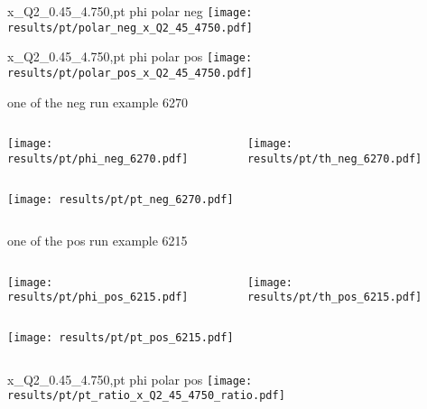 \begin{frame}{x\_Q2\_0.45\_4.750,pt phi polar neg}
\texttt{[image: results/pt/polar\_neg\_x\_Q2\_45\_4750.pdf]}
\end{frame}
\begin{frame}{x\_Q2\_0.45\_4.750,pt phi polar pos}
\texttt{[image: results/pt/polar\_pos\_x\_Q2\_45\_4750.pdf]}
\end{frame}
\begin{frame}{one of the neg run example 6270}
\begin{columns}
\begin{column}[T]{0.5\textwidth}
\texttt{[image: results/pt/phi\_neg\_6270.pdf]}
\end{column}
\begin{column}[T]{0.5\textwidth}
\texttt{[image: results/pt/th\_neg\_6270.pdf]}
\end{column}
\end{columns}
\begin{columns}
\begin{column}[T]{0.5\textwidth}
\texttt{[image: results/pt/pt\_neg\_6270.pdf]}
\end{column}
\begin{column}[T]{0.5\textwidth}
\end{column}
\end{columns}
\end{frame}
\begin{frame}{one of the pos run example 6215}
\begin{columns}
\begin{column}[T]{0.5\textwidth}
\texttt{[image: results/pt/phi\_pos\_6215.pdf]}
\end{column}
\begin{column}[T]{0.5\textwidth}
\texttt{[image: results/pt/th\_pos\_6215.pdf]}
\end{column}
\end{columns}
\begin{columns}
\begin{column}[T]{0.5\textwidth}
\texttt{[image: results/pt/pt\_pos\_6215.pdf]}
\end{column}
\begin{column}[T]{0.5\textwidth}
\end{column}
\end{columns}
\end{frame}
\begin{frame}{x\_Q2\_0.45\_4.750,pt phi polar pos}
\texttt{[image: results/pt/pt\_ratio\_x\_Q2\_45\_4750\_ratio.pdf]}
\end{frame}
